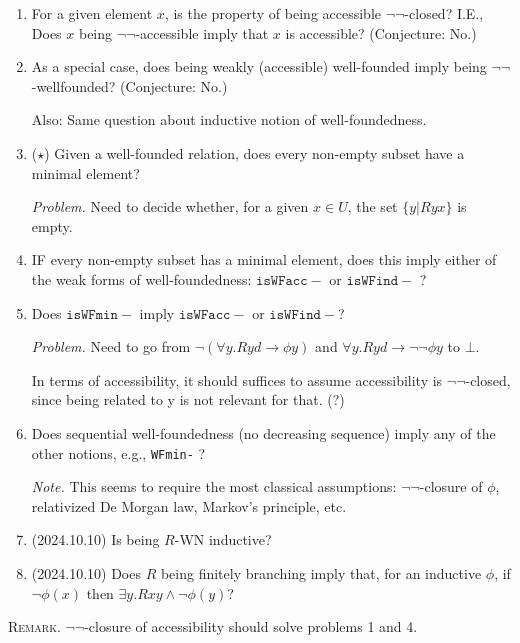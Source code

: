 \documentclass{scrartcl}
\begin{document}
\begin{enumerate}
  \item For a given element $x$, is the property of
  being accessible $\lnot\lnot$-closed? I.E.,
  Does $x$ being $\lnot\lnot$-accessible imply that $x$ is accessible?
  (Conjecture: No.)

  \item As a special case, does being weakly (accessible) well-founded imply being $\lnot\lnot$-wellfounded?
  (Conjecture: No.)

  Also: Same question about inductive notion of well-foundedness.

  \item ($\star$) Given a well-founded relation, does every non-empty subset
  have a minimal element?

  \emph{Problem.} Need to decide whether, for a given $x \in U$,
   the set $\{y | Ryx\}$ is empty.

   \item IF every non-empty subset has a minimal element, does this imply
   either of the weak forms of well-foundedness: $\mathtt{isWFacc-}$ or
   $\mathtt{isWFind-}$ ?

   \item Does $\mathtt{isWFmin-}$ imply $\mathtt{isWFacc-}$ or $\mathtt{isWFind-}$?

   \emph{Problem.} Need to go from $\lnot (\forall y. R y d \to \phi y)$
   and $\forall y. R y d \to \lnot \lnot \phi y$ to $\bot$.

   In terms of accessibility, it should suffices to assume accessibility is
   $\lnot\lnot$-closed, since being related to y is not relevant for that. (?)

   \item Does sequential well-foundedness (no decreasing sequence) imply
   any of the other notions, e.g., \texttt{WFmin-} ?

   \emph{Note.}  This seems to require the most classical assumptions:
   $\lnot\lnot$-closure of $\phi$, relativized De Morgan law,
   Markov's principle, etc.

   \item (2024.10.10) Is being $R$-WN inductive?
   \item (2024.10.10) Does $R$ being finitely branching imply
   that, for an inductive $\phi$, if $\lnot \phi(x)$ then
   $\exists y. Rxy \land \lnot \phi(y)$?

\end{enumerate}

\textsc{Remark.}
$\lnot\lnot$-closure of accessibility should solve problems 1 and 4.
\end{document}
